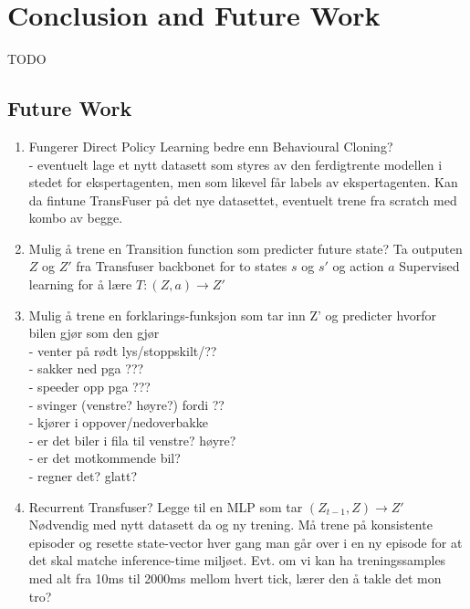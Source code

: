 \chapter{Conclusion and Future Work}
\label{chap:conclusion}

TODO


\section{Future Work}

\begin{enumerate}
    \item Fungerer Direct Policy Learning bedre enn Behavioural Cloning?
        \\ - eventuelt lage et nytt datasett som styres av den ferdigtrente modellen i stedet for ekspertagenten,
            men som likevel får labels av ekspertagenten. Kan da fintune TransFuser på det nye datasettet, eventuelt trene fra scratch med kombo av begge.

    \item Mulig å trene en Transition function som predicter future state?
        Ta outputen $Z$ og $Z'$ fra Transfuser backbonet for to states $s$ og $s'$ og action $a$
        Supervised learning for å lære $T: (Z, a) \rightarrow Z'$

    \item Mulig å trene en forklarings-funksjon som tar inn Z' og predicter hvorfor bilen gjør som den gjør
        \\ - venter på rødt lys/stoppskilt/??
        \\ - sakker ned pga ???
        \\ - speeder opp pga ???
        \\ - svinger (venstre? høyre?) fordi ??
        \\ - kjører i oppover/nedoverbakke
        \\ - er det biler i fila til venstre? høyre?
        \\ - er det motkommende bil?
        \\ - regner det? glatt?

    \item Recurrent Transfuser? Legge til en MLP som tar $(Z_{t-1}, Z) \rightarrow Z'$
        Nødvendig med nytt datasett da og ny trening. Må trene på konsistente episoder og resette state-vector hver gang man går over i en ny episode for at det skal matche inference-time miljøet. Evt. om vi kan ha treningssamples med alt fra 10ms til 2000ms mellom hvert tick, lærer den å takle det mon tro?


\end{enumerate}
